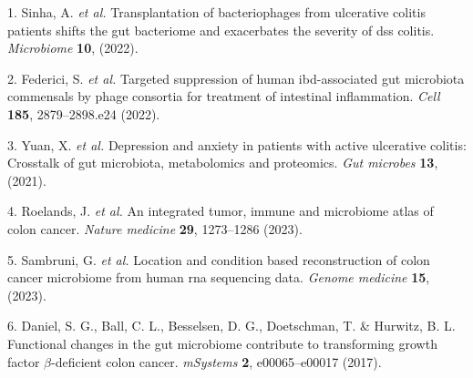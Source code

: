 \documentclass[
]{article}
\newenvironment{cslreferences}%
  {}%
  {\par}
\begin{document}
\hypertarget{refs}{}
\begin{cslreferences}
\leavevmode\hypertarget{ref-TransplantationSinha2022}{}%
1. Sinha, A. \emph{et al.} Transplantation of bacteriophages from ulcerative colitis patients shifts the gut bacteriome and exacerbates the severity of dss colitis. \emph{Microbiome} \textbf{10}, (2022).

\leavevmode\hypertarget{ref-TargetedSuppreFederi2022}{}%
2. Federici, S. \emph{et al.} Targeted suppression of human ibd-associated gut microbiota commensals by phage consortia for treatment of intestinal inflammation. \emph{Cell} \textbf{185}, 2879--2898.e24 (2022).

\leavevmode\hypertarget{ref-DepressionAndYuan2021}{}%
3. Yuan, X. \emph{et al.} Depression and anxiety in patients with active ulcerative colitis: Crosstalk of gut microbiota, metabolomics and proteomics. \emph{Gut microbes} \textbf{13}, (2021).

\leavevmode\hypertarget{ref-AnIntegratedTRoelan2023}{}%
4. Roelands, J. \emph{et al.} An integrated tumor, immune and microbiome atlas of colon cancer. \emph{Nature medicine} \textbf{29}, 1273--1286 (2023).

\leavevmode\hypertarget{ref-LocationAndCoSambru2023}{}%
5. Sambruni, G. \emph{et al.} Location and condition based reconstruction of colon cancer microbiome from human rna sequencing data. \emph{Genome medicine} \textbf{15}, (2023).

\leavevmode\hypertarget{ref-FunctionalChanDaniel2017}{}%
6. Daniel, S. G., Ball, C. L., Besselsen, D. G., Doetschman, T. \& Hurwitz, B. L. Functional changes in the gut microbiome contribute to transforming growth factor \(\beta\)-deficient colon cancer. \emph{mSystems} \textbf{2}, e00065--e00017 (2017).
\end{cslreferences}
\end{document}
